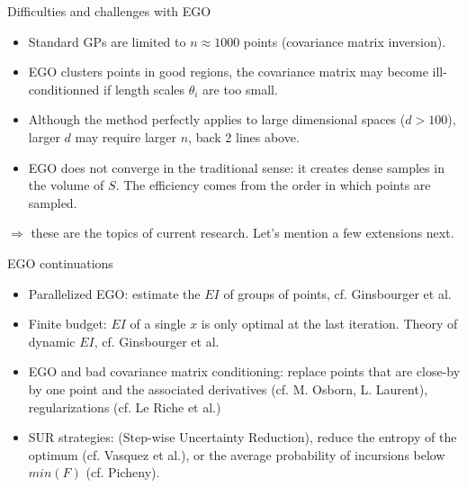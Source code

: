 \begin{frame}{}
\begin{exampleblock}{Difficulties and challenges with EGO}
\begin{itemize}
\item Standard GPs are limited to $n \approx 1000$ points (covariance matrix inversion).
\item EGO clusters points in good regions, the covariance matrix may become ill-conditionned 
if length scales $\theta_i$ are too small.
\item Although the method perfectly applies to large dimensional spaces ($d>100$), larger $d$ 
may require larger $n$, back 2 lines above.
\item EGO does not converge in the traditional sense: it creates dense samples in the volume of $S$. 
The efficiency comes from the order in which points are sampled.
\end{itemize}
$\Rightarrow$ these are the topics of current research. Let's mention a few extensions next.
\end{exampleblock}
\end{frame}

\begin{frame}{}
\begin{exampleblock}{EGO continuations}
\begin{itemize}
\item Parallelized EGO: estimate the $EI$ of groups of points, cf. Ginsbourger et al. 
\item Finite budget: $EI$ of a single $x$ is only optimal at the last iteration. Theory of dynamic $EI$, cf. Ginsbourger et al.
\item EGO and bad covariance matrix conditioning: replace points that are close-by by one point and the associated derivatives (cf. M. Osborn, L. Laurent), regularizations (cf. Le Riche et al.)
\item SUR strategies: (Step-wise Uncertainty Reduction), reduce the entropy of the optimum (cf. Vasquez et al.), or the average probability of incursions below $min(F)$ (cf. Picheny).
\end{itemize}
\end{exampleblock}
\end{frame}

